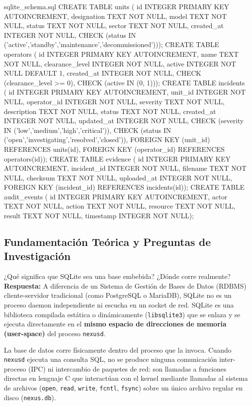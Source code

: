 \documentclass[10pt,a4paper]{article}
\begin{document}
\begin{terminalbox}{sqlite_schema.sql}
CREATE TABLE units ( id INTEGER PRIMARY KEY AUTOINCREMENT, designation TEXT NOT NULL, model TEXT NOT NULL, status TEXT NOT NULL, sector TEXT NOT NULL, created_at INTEGER NOT NULL, CHECK (status IN ('active','standby','maintenance','decommissioned')));
CREATE TABLE operators ( id INTEGER PRIMARY KEY AUTOINCREMENT, name TEXT NOT NULL, clearance_level INTEGER NOT NULL, active INTEGER NOT NULL DEFAULT 1, created_at INTEGER NOT NULL, CHECK (clearance_level >= 0), CHECK (active IN (0, 1)));
CREATE TABLE incidents ( id INTEGER PRIMARY KEY AUTOINCREMENT, unit_id INTEGER NOT NULL, operator_id INTEGER NOT NULL, severity TEXT NOT NULL, description TEXT NOT NULL, status TEXT NOT NULL, created_at INTEGER NOT NULL, updated_at INTEGER NOT NULL, CHECK (severity IN ('low','medium','high','critical')), CHECK (status IN ('open','investigating','resolved','closed')), FOREIGN KEY (unit_id) REFERENCES units(id), FOREIGN KEY (operator_id) REFERENCES operators(id));
CREATE TABLE evidence ( id INTEGER PRIMARY KEY AUTOINCREMENT, incident_id INTEGER NOT NULL, filename TEXT NOT NULL, checksum TEXT NOT NULL, uploaded_at INTEGER NOT NULL, FOREIGN KEY (incident_id) REFERENCES incidents(id));
CREATE TABLE audit_events ( id INTEGER PRIMARY KEY AUTOINCREMENT, actor TEXT NOT NULL, action TEXT NOT NULL, resource TEXT NOT NULL, result TEXT NOT NULL, timestamp INTEGER NOT NULL);
\end{terminalbox}

\subsection{Fundamentación Teórica y Preguntas de Investigación}

\begin{pregunta}{¿Qué significa que SQLite sea una base embebida? ¿Dónde corre realmente?}
    \textbf{Respuesta:} A diferencia de un Sistema de Gestión de Bases de Datos (RDBMS) cliente-servidor tradicional (como PostgreSQL o MariaDB), SQLite no es un proceso daemon independiente ni escucha en un socket de red. SQLite es una biblioteca compilada estática o dinámicamente (\texttt{libsqlite3}) que se enlaza y se ejecuta directamente en el \textbf{mismo espacio de direcciones de memoria (user-space)} del proceso \texttt{nexusd}.
    
    La base de datos corre físicamente dentro del proceso que la invoca. Cuando \texttt{nexusd} ejecuta una consulta SQL, no se produce ninguna comunicación inter-proceso (IPC) ni intercambio de paquetes de red: son llamadas a funciones directas en lenguaje C que interactúan con el kernel mediante llamadas al sistema de archivos (\texttt{open}, \texttt{read}, \texttt{write}, \texttt{fcntl}, \texttt{fsync}) sobre un único archivo regular en disco (\texttt{nexus.db}).
\end{pregunta}
\end{document}
